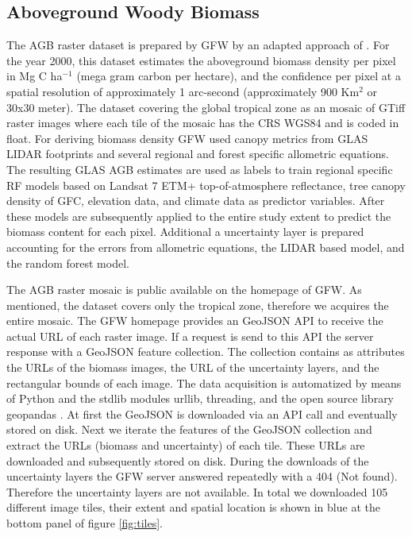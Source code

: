 	\subsection{Aboveground Woody Biomass}
		The \ac{AGB} raster dataset is prepared by \ac{GFW} by an adapted approach of \citeauthor{Baccini2012} \citep{Baccini2012,Baccini2015,Baccini2017}. For the year 2000, this dataset estimates the aboveground biomass density per pixel in Mg C ha$^{-1}$ (mega gram carbon per hectare), and the confidence per pixel at a spatial resolution of approximately 1 arc-second (approximately 900 Km$^2$ or 30x30 meter). The dataset covering the global tropical zone as an mosaic of \ac{GTiff} raster images where each tile of the mosaic has the \ac{CRS} \ac{WGS84} and is coded in float. For deriving biomass density \ac{GFW} used canopy metrics from \ac{GLAS} \ac{LIDAR} footprints and several regional and forest specific allometric equations. The resulting \ac{GLAS} \ac{AGB} estimates are used as labels to train regional specific \ac{RF} models based on Landsat 7 \ac{ETM+} top-of-atmosphere reflectance, tree canopy density of \ac{GFC}, elevation data, and climate data as predictor variables. After these models are subsequently applied to the entire study extent to predict the biomass content for each pixel. Additional a uncertainty layer is prepared accounting for the errors from allometric equations, the \ac{LIDAR} based model, and the random forest model.

		The \ac{AGB} raster mosaic is public available on the homepage of \ac{GFW}. As mentioned, the dataset covers only the tropical zone, therefore we acquires the entire mosaic. The \ac{GFW} homepage provides an \ac{GeoJSON} \ac{API} to receive the actual \ac{URL} of each raster image. If a request is send to this \ac{API} the server response with a \ac{GeoJSON} feature collection. The collection contains as attributes the \ac{URL}s of the biomass images, the \ac{URL} of the uncertainty layers, and the rectangular bounds of each image. The data acquisition is automatized by means of Python and the \ac{stdlib} modules urllib, threading, and the open source library geopandas \citep{Rossum2018,McKinney2010}. At first the \ac{GeoJSON} is downloaded via an \ac{API} call and eventually stored on disk. Next we iterate the features of the \ac{GeoJSON} collection and extract the \ac{URL}s (biomass and uncertainty) of each tile. These \ac{URL}s are downloaded and subsequently stored on disk. During the downloads of the uncertainty layers the \ac{GFW} server answered repeatedly with a 404 (Not found). Therefore the uncertainty layers are not available. In total we downloaded 105 different image tiles, their extent and spatial location is shown in blue at the bottom panel of figure \ref{fig:tiles}.

